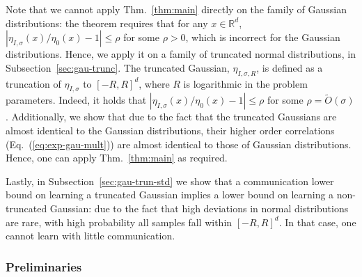 \documentclass[final, 12pt]{colt2018}
\newcommand{\subsecref}[1]{Subsection~\ref{#1}}
\renewcommand{\eqref}[1]{Eq.~(\ref{#1})}
\newcommand{\thmref}[1]{Thm.~\ref{#1}}
\begin{document}
Note that we cannot apply \thmref{thm:main} directly on the family of Gaussian distributions: the theorem requires that for any $x \in \mathbb{R}^d$, $|\eta_{I,\sigma}(x)/\eta_0(x)-1| \le \rho$ for some $\rho > 0$, which is incorrect for the Gaussian distributions. Hence, we apply it on a family of truncated normal distributions, in \subsecref{sec:gau-trunc}.
The truncated Gaussian, $\eta_{I,\sigma,R}$, is defined as a truncation of $\eta_{I,\sigma}$ to $[-R,R]^d$, where $R$ is logarithmic in the problem parameters. Indeed, it holds that $|\eta_{I,\sigma}(x)/\eta_0(x)-1| \le \rho$ for some $\rho = \tilde{O}(\sigma)$. Additionally, we show that due to the fact that the truncated Gaussians are almost identical to the Gaussian distributions, their higher order correlations (\eqref{eq:exp-gau-mult}) are almost identical to those of Gaussian distributions. Hence, one can apply \thmref{thm:main} as required.

Lastly, in \subsecref{sec:gau-trun-std} we show that a communication lower bound on learning a truncated Gaussian implies a lower bound on learning a non-truncated Gaussian: due to the fact that high deviations in normal distributions are rare, with high probability all samples fall within $[-R,R]^d$. In that case, one cannot learn with little communication.

\subsubsection{Preliminaries} \label{sec:pr-gau-prel}
\end{document}
